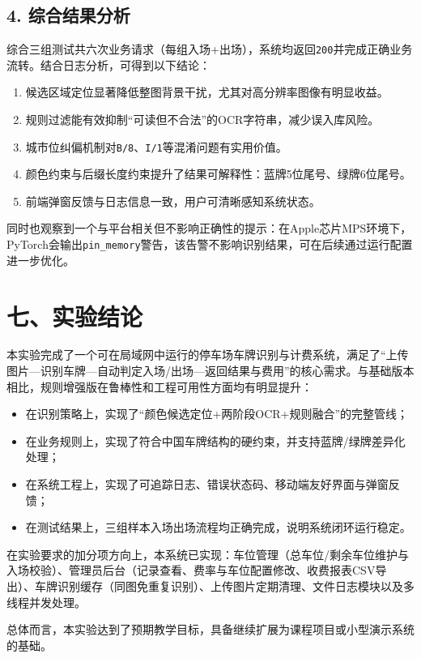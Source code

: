 \documentclass[12pt,a4paper]{article}
\begin{document}
\subsection*{4. 综合结果分析}
综合三组测试共六次业务请求（每组入场+出场），系统均返回\texttt{200}并完成正确业务流转。结合日志分析，可得到以下结论：
\begin{enumerate}
  \item 候选区域定位显著降低整图背景干扰，尤其对高分辨率图像有明显收益。
  \item 规则过滤能有效抑制“可读但不合法”的OCR字符串，减少误入库风险。
  \item 城市位纠偏机制对\texttt{B/8}、\texttt{I/1}等混淆问题有实用价值。
  \item 颜色约束与后缀长度约束提升了结果可解释性：蓝牌5位尾号、绿牌6位尾号。
  \item 前端弹窗反馈与日志信息一致，用户可清晰感知系统状态。
\end{enumerate}

同时也观察到一个与平台相关但不影响正确性的提示：在Apple芯片MPS环境下，PyTorch会输出\texttt{pin\_memory}警告，该告警不影响识别结果，可在后续通过运行配置进一步优化。

\section*{七、实验结论}
本实验完成了一个可在局域网中运行的停车场车牌识别与计费系统，满足了“上传图片—识别车牌—自动判定入场/出场—返回结果与费用”的核心需求。与基础版本相比，规则增强版在鲁棒性和工程可用性方面均有明显提升：

\begin{itemize}
  \item 在识别策略上，实现了“颜色候选定位+两阶段OCR+规则融合”的完整管线；
  \item 在业务规则上，实现了符合中国车牌结构的硬约束，并支持蓝牌/绿牌差异化处理；
  \item 在系统工程上，实现了可追踪日志、错误状态码、移动端友好界面与弹窗反馈；
  \item 在测试结果上，三组样本入场出场流程均正确完成，说明系统闭环运行稳定。
\end{itemize}

在实验要求的加分项方向上，本系统已实现：车位管理（总车位/剩余车位维护与入场校验）、管理员后台（记录查看、费率与车位配置修改、收费报表CSV导出）、车牌识别缓存（同图免重复识别）、上传图片定期清理、文件日志模块以及多线程并发处理。

总体而言，本实验达到了预期教学目标，具备继续扩展为课程项目或小型演示系统的基础。
\end{document}

